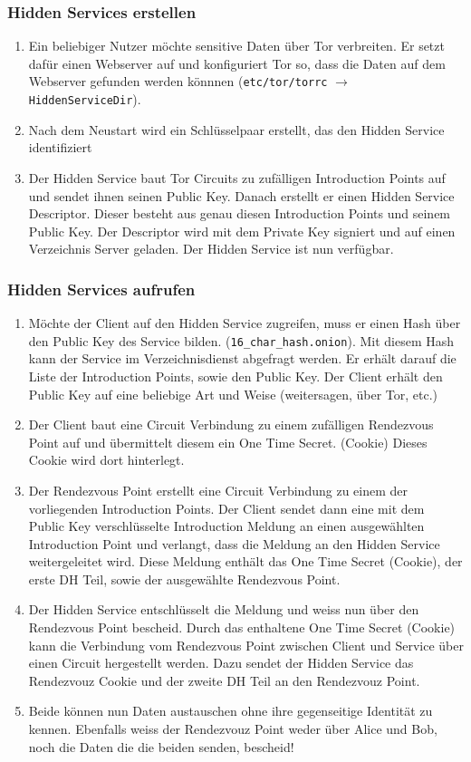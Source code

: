\subsubsection{Hidden Services erstellen}
\begin{enumerate}
	\item Ein beliebiger Nutzer möchte sensitive Daten über Tor verbreiten. Er setzt dafür einen Webserver auf und konfiguriert Tor so, dass die Daten auf dem Webserver gefunden werden könnnen (\lstinline|etc/tor/torrc| $\rightarrow$ \lstinline|HiddenServiceDir|).
	\item Nach dem Neustart wird ein Schlüsselpaar erstellt, das den Hidden Service identifiziert
	\item Der Hidden Service baut Tor Circuits zu zufälligen Introduction Points auf und sendet ihnen seinen Public Key. Danach erstellt er einen Hidden Service Descriptor. Dieser besteht aus genau diesen Introduction Points und seinem Public Key. Der Descriptor wird mit dem Private Key signiert und auf einen Verzeichnis Server geladen. Der Hidden Service ist nun verfügbar.
\end{enumerate}
\subsubsection{Hidden Services aufrufen}
\begin{enumerate}
	\item Möchte der Client auf den Hidden Service zugreifen, muss er einen Hash über den Public Key des Service bilden. (\lstinline|16_char_hash.onion|). Mit diesem Hash kann der Service im Verzeichnisdienst abgefragt werden. Er erhält darauf die Liste der Introduction Points, sowie den Public Key. Der Client erhält den Public Key auf eine beliebige Art und Weise (weitersagen, über Tor, etc.)
	\item Der Client baut eine Circuit Verbindung zu einem zufälligen Rendezvous Point auf und übermittelt diesem ein One Time Secret. (Cookie) Dieses Cookie wird dort hinterlegt.
	\item Der Rendezvous Point erstellt eine Circuit Verbindung zu einem der vorliegenden Introduction Points. Der Client sendet dann eine mit dem Public Key verschlüsselte Introduction Meldung an einen ausgewählten Introduction Point und verlangt, dass die Meldung an den Hidden Service weitergeleitet wird. Diese Meldung enthält das One Time Secret (Cookie), der erste DH Teil, sowie der ausgewählte Rendezvous Point. 
	\item Der Hidden Service entschlüsselt die Meldung und weiss nun über den Rendezvous Point bescheid. Durch das enthaltene One Time Secret (Cookie) kann die Verbindung vom Rendezvous Point zwischen Client und Service über einen Circuit hergestellt werden. Dazu sendet der Hidden Service das Rendezvouz Cookie und der zweite DH Teil an den Rendezvouz Point.
	\item Beide können nun Daten austauschen ohne ihre gegenseitige Identität zu kennen. Ebenfalls weiss der Rendezvouz Point weder über Alice und Bob, noch die Daten die die beiden senden, bescheid!
\end{enumerate}

